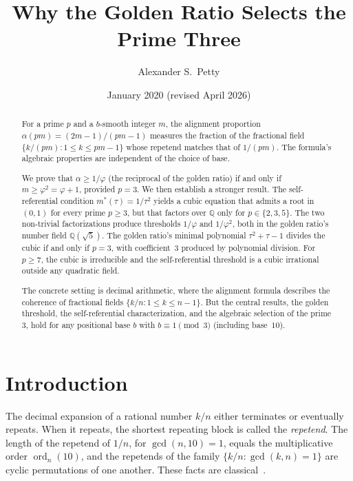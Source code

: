 \documentclass[12pt]{amsart}
\title{Why the Golden Ratio Selects the Prime Three}
\author{Alexander S.\ Petty}
\date{January 2020 (revised April 2026)}
\theoremstyle{definition}
\theoremstyle{remark}
\begin{document}
\begin{abstract}
For a prime $p$ and a $b$-smooth integer $m$, the alignment
proportion $\alpha(pm) = (2m{-}1)/(pm{-}1)$ measures the fraction
of the fractional field $\{k/(pm) : 1 \le k \le pm{-}1\}$ whose
repetend matches that of $1/(pm)$. The formula's algebraic
properties are independent of the choice of base.

We prove that $\alpha \ge 1/\varphi$ (the reciprocal of the golden
ratio) if and only if $m \ge \varphi^{2} = \varphi + 1$, provided
$p = 3$. We then establish a stronger result. The self-referential
condition $m^{*}(\tau) = 1/\tau^{2}$ yields a cubic equation that
admits a root in $(0,1)$ for every prime $p \ge 3$, but that factors
over $\mathbb{Q}$ only for $p \in \{2, 3, 5\}$. The two non-trivial
factorizations produce thresholds $1/\varphi$ and $1/\varphi^{2}$,
both in the golden ratio's number field $\mathbb{Q}(\sqrt{5})$. The
golden ratio's minimal polynomial $\tau^{2} + \tau - 1$ divides the
cubic if and only if $p = 3$, with coefficient~$3$ produced by
polynomial division. For $p \ge 7$, the cubic is irreducible and the
self-referential threshold is a cubic irrational outside any quadratic
field.

The concrete setting is decimal arithmetic, where the alignment formula
describes the coherence of fractional fields $\{k/n : 1 \le k \le
n{-}1\}$. But the central results, the golden threshold, the
self-referential characterization, and the algebraic selection of the
prime~$3$, hold for any positional base $b$ with
$b \equiv 1 \pmod{3}$ (including base~$10$).
\end{abstract}
\maketitle

\section{Introduction}

The decimal expansion of a rational number $k/n$ either terminates or
eventually repeats. When it repeats, the shortest repeating block is
called the \emph{repetend}. The length of the repetend of $1/n$, for
$\gcd(n,10)=1$, equals the multiplicative order
$\operatorname{ord}_{n}(10)$, and the repetends of the family
$\{k/n : \gcd(k,n)=1\}$ are cyclic permutations of one another. These
facts are classical~\cite{hardy}.
\end{document}

